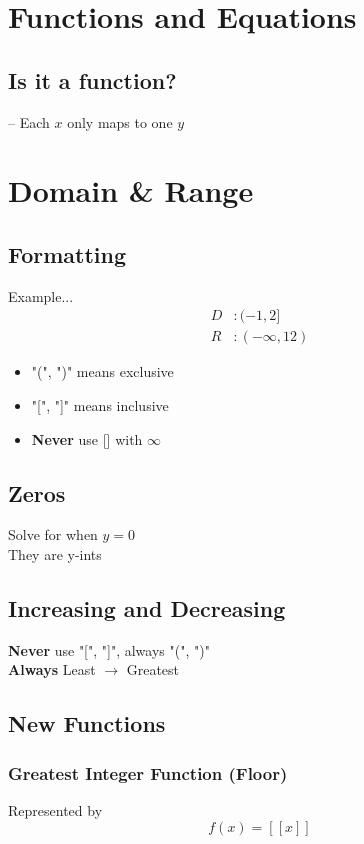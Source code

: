 \documentclass[twocolumn]{article}
\newcommand{\bd}{\textbf}
\begin{document}
    \section{Functions and Equations}
    
    \subsection{Is it a function?}
   	-- Each $x$ only maps to one $y$
   	
   	\section{Domain \& Range}
   	
   	\subsection{Formatting}
   	Example...
   	\begin{align*}
   		D&: (-1,2] \\
   		R&: (-\infty, 12)
   	\end{align*}
   \begin{itemize}[label=--]
   	\item "(", ")" means exclusive
   	\item "[", "]" means inclusive
   	\item \bd{Never} use [] with $\infty$
   \end{itemize}
   	
   	\subsection{Zeros}
   	Solve for when $y = 0$ \\
   	They are y-ints
   	
   	\subsection{Increasing and Decreasing}
   	\par \bd{Never} use "[", "]", always "(", ")" \\
   	\bd{Always} Least $\to$ Greatest \\
   	
   	\subsection{New Functions}
   	
   	\subsubsection{Greatest Integer Function (Floor)}
    Represented by
    \begin{equation*}
    	f(x) = [[x]]
    \end{equation*}
   	
\end{document}
